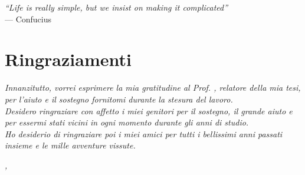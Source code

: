 {}

\begin{flushright}{
    \slshape
    ``Life is really simple, but we insist on making it complicated''} \\
    \medskip
    --- Confucius
\end{flushright}


\bigskip

\begingroup
\let\clearpage\relax
\let\cleardoublepage\relax
\let\cleardoublepage\relax

\chapter*{Ringraziamenti}

\noindent \textit{Innanzitutto, vorrei esprimere la mia gratitudine al Prof. \myProf, relatore della mia tesi, per l'aiuto e il sostegno fornitomi durante la stesura del lavoro.}\\

\noindent \textit{Desidero ringraziare con affetto i miei genitori per il sostegno, il grande aiuto e per essermi stati vicini in ogni momento durante gli anni di studio.}\\

\noindent \textit{Ho desiderio di ringraziare poi i miei amici per tutti i bellissimi anni passati insieme e le mille avventure vissute.}\\
\bigskip

\noindent\textit{\myLocation, \myTime}
\hfill \myName

\endgroup
